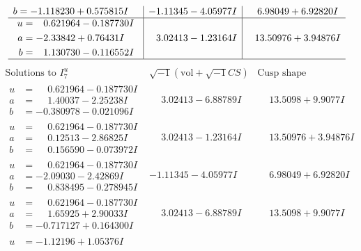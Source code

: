 \documentclass[1p]{elsarticle_modified}
\theoremstyle{definition}
\newcommand{\I}{\sqrt{-1}}
\begin{document}
$$\begin{array}{c|c|c}
\begin{aligned}
b &= -1.118230 + 0.575815 I\end{aligned}
 & -1.11345 - 4.05977 I & \phantom{-}6.98049 + 6.92820 I \\ \hline\begin{aligned}
u &= \phantom{-}0.621964 - 0.187730 I \\
a &= -2.33842 + 0.76431 I \\
b &= \phantom{-}1.130730 - 0.116552 I\end{aligned}
 & \phantom{-}3.02413 - 1.23164 I & \phantom{-}13.50976 + 3.94876 I\\
 \hline 
 \end{array}$$\newpage$$\begin{array}{c|c|c}  
\text{Solutions to }I^u_{7}& \I (\text{vol} + \sqrt{-1}CS) & \text{Cusp shape}\\
 \hline 
\begin{aligned}
u &= \phantom{-}0.621964 - 0.187730 I \\
a &= \phantom{-}1.40037 - 2.25238 I \\
b &= -0.380978 - 0.021096 I\end{aligned}
 & \phantom{-}3.02413 - 6.88789 I & \phantom{-}13.5098 + 9.9077 I \\ \hline\begin{aligned}
u &= \phantom{-}0.621964 - 0.187730 I \\
a &= \phantom{-}0.12513 - 2.86825 I \\
b &= \phantom{-}0.156590 - 0.073972 I\end{aligned}
 & \phantom{-}3.02413 - 1.23164 I & \phantom{-}13.50976 + 3.94876 I \\ \hline\begin{aligned}
u &= \phantom{-}0.621964 - 0.187730 I \\
a &= -2.09030 - 2.42869 I \\
b &= \phantom{-}0.838495 - 0.278945 I\end{aligned}
 & -1.11345 - 4.05977 I & \phantom{-}6.98049 + 6.92820 I \\ \hline\begin{aligned}
u &= \phantom{-}0.621964 - 0.187730 I \\
a &= \phantom{-}1.65925 + 2.90033 I \\
b &= -0.717127 + 0.164300 I\end{aligned}
 & \phantom{-}3.02413 - 6.88789 I & \phantom{-}13.5098 + 9.9077 I \\ \hline\begin{aligned}
u &= -1.12196 + 1.05376 I \\

\end{aligned}
\end{array}$$
\end{document}

